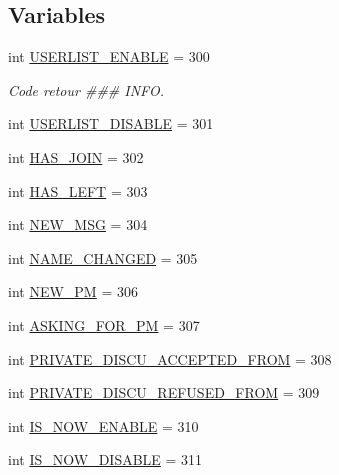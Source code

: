 \subsection*{Variables}
\begin{DoxyCompactItemize}
\item 
int \hyperlink{namespaceserveur_1_1_server_a4712f809a0369863821f1f3611b0c6a9}{U\+S\+E\+R\+L\+I\+S\+T\+\_\+\+E\+N\+A\+B\+L\+E} = 300
\begin{DoxyCompactList}\small\item\em Code retour \#\#\# I\+N\+F\+O. \end{DoxyCompactList}\item 
int \hyperlink{namespaceserveur_1_1_server_a90e5e028b94e11e73745c0830ea48dd6}{U\+S\+E\+R\+L\+I\+S\+T\+\_\+\+D\+I\+S\+A\+B\+L\+E} = 301
\item 
int \hyperlink{namespaceserveur_1_1_server_ac0f5caaab094186afb567ed676c6c436}{H\+A\+S\+\_\+\+J\+O\+I\+N} = 302
\item 
int \hyperlink{namespaceserveur_1_1_server_aee84037f6f1efd56db62026cf807154a}{H\+A\+S\+\_\+\+L\+E\+F\+T} = 303
\item 
int \hyperlink{namespaceserveur_1_1_server_ad8db2b5152d0350c9409bfc9ba4dcd9d}{N\+E\+W\+\_\+\+M\+S\+G} = 304
\item 
int \hyperlink{namespaceserveur_1_1_server_ab1031701e2171ce16c5dd1a070475f57}{N\+A\+M\+E\+\_\+\+C\+H\+A\+N\+G\+E\+D} = 305
\item 
int \hyperlink{namespaceserveur_1_1_server_aa668a288f5b7e4fb9aec27110086d34b}{N\+E\+W\+\_\+\+P\+M} = 306
\item 
int \hyperlink{namespaceserveur_1_1_server_a5971c26b5a11d4b32fb157f394dbf970}{A\+S\+K\+I\+N\+G\+\_\+\+F\+O\+R\+\_\+\+P\+M} = 307
\item 
int \hyperlink{namespaceserveur_1_1_server_ae4a2e2d9be1880700b134a73845a5520}{P\+R\+I\+V\+A\+T\+E\+\_\+\+D\+I\+S\+C\+U\+\_\+\+A\+C\+C\+E\+P\+T\+E\+D\+\_\+\+F\+R\+O\+M} = 308
\item 
int \hyperlink{namespaceserveur_1_1_server_a09d0e3676dc690b25a7383d8cfe539ee}{P\+R\+I\+V\+A\+T\+E\+\_\+\+D\+I\+S\+C\+U\+\_\+\+R\+E\+F\+U\+S\+E\+D\+\_\+\+F\+R\+O\+M} = 309
\item 
int \hyperlink{namespaceserveur_1_1_server_ac22188a1cc57ff59633b41f74b8b51c6}{I\+S\+\_\+\+N\+O\+W\+\_\+\+E\+N\+A\+B\+L\+E} = 310
\item 
int \hyperlink{namespaceserveur_1_1_server_a3550282baac54ac0efc954c284cd84d5}{I\+S\+\_\+\+N\+O\+W\+\_\+\+D\+I\+S\+A\+B\+L\+E} = 311
\item 

\end{DoxyCompactItemize}
